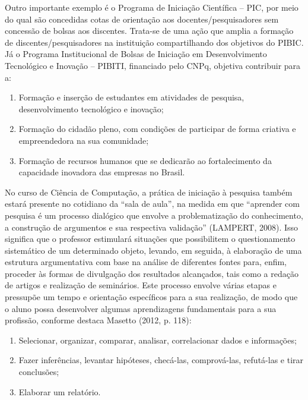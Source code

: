 \documentclass[
	12pt,				%
	openright,			%
  oneside,     %
	a4paper,			%
	chapter=TITLE,		%
	english,			%
	french,				%
	spanish,			%
	brazil				%
	]{abntex2}
\begin{document}
Outro importante exemplo é o Programa de Iniciação Científica – PIC, por meio do qual são concedidas cotas de orientação aos docentes/pesquisadores sem concessão de bolsas aos discentes. Trata-se de uma ação que amplia a formação de discentes/pesquisadores na instituição compartilhando dos objetivos do PIBIC. Já o Programa Institucional de Bolsas de Iniciação em Desenvolvimento Tecnológico e Inovação – PIBITI, financiado pelo CNPq, objetiva contribuir para a:

\begin{enumerate}[label=(\alph*)]
    \item Formação e inserção de estudantes em atividades de pesquisa,  desenvolvimento tecnológico e inovação;
    \item Formação do cidadão pleno, com condições de participar de forma criativa e empreendedora na sua comunidade;
    \item Formação de recursos humanos que se dedicarão ao fortalecimento da capacidade inovadora das 	empresas no Brasil.
\end{enumerate}

No curso de Ciência de Computação, a prática de iniciação à pesquisa também estará presente no cotidiano da “sala de aula”, na medida em que “aprender com pesquisa é um processo dialógico que envolve a problematização do conhecimento, a construção de argumentos e sua respectiva validação” (LAMPERT, 2008). Isso significa que o professor estimulará situações que possibilitem o questionamento sistemático de um determinado objeto, levando, em seguida, à elaboração de uma estrutura argumentativa com base na análise de diferentes fontes para, enfim, proceder às formas de divulgação dos resultados alcançados, tais como a redação de artigos e realização de seminários. Este processo envolve várias etapas e pressupõe um tempo e orientação específicos para a sua realização, de modo que o aluno possa desenvolver algumas aprendizagens fundamentais para a sua profissão, conforme destaca Masetto (2012, p. 118):

\begin{enumerate}[label=(\alph*)]
    \item Selecionar, organizar, comparar, analisar, correlacionar dados e informações;
    \item Fazer inferências, levantar hipóteses, checá-las, comprová-las, refutá-las e tirar conclusões;
    \item Elaborar um relatório.
\end{enumerate}
\end{document}
